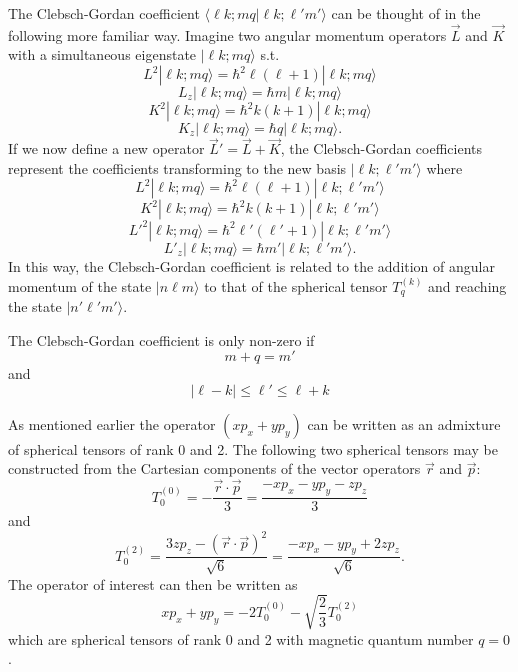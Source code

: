 \documentclass[preprint,12pt]{elsarticle}
\begin{document}
The Clebsch-Gordan coefficient $\langle\ell k;mq|\ell
k;\ell'm'\rangle$ can be thought of in the following more familiar
way.  Imagine two angular momentum operators $\vec{L}$ and $\vec{K}$
with a simultaneous eigenstate $|\ell k;mq\rangle$ s.t.
\begin{equation}
L^2|\ell k;mq\rangle=\hbar^2\ell(\ell+1)|\ell k;mq\rangle
\end{equation}
\begin{equation}
L_z|\ell k;mq\rangle=\hbar m|\ell k;mq\rangle
\end{equation}
\begin{equation}
K^2|\ell k;mq\rangle=\hbar^2k(k+1)|\ell k;mq\rangle
\end{equation}
\begin{equation}
K_z|\ell k;mq\rangle=\hbar q|\ell k;mq\rangle.
\end{equation}
If we now define a new operator $\vec{L}'=\vec{L}+\vec{K}$, the
Clebsch-Gordan coefficients represent the coefficients transforming to
the new basis $|\ell k;\ell'm'\rangle$ where
\begin{equation}
L^2|\ell k;mq\rangle=\hbar^2\ell(\ell+1)|\ell k;\ell'm'\rangle
\end{equation}
\begin{equation}
K^2|\ell k;mq\rangle=\hbar^2k(k+1)|\ell k;\ell'm'\rangle
\end{equation}
\begin{equation}
L'^2|\ell k;mq\rangle=\hbar^2\ell'(\ell'+1)|\ell k;\ell'm'\rangle
\end{equation}
\begin{equation}
L'_z|\ell k;mq\rangle=\hbar m'|\ell k;\ell'm'\rangle.
\end{equation}
In this way, the Clebsch-Gordan coefficient is related to the addition
of angular momentum of the state $|n\ell m\rangle$ to that of the
spherical tensor $T_q^{(k)}$ and reaching the state
$|n'\ell'm'\rangle$.

The Clebsch-Gordan coefficient is only non-zero if
\begin{equation}
  \label{eq:z}
  m+q=m'
\end{equation}
and
\begin{equation}
\label{eq:ell}
  |\ell-k|\leq\ell'\leq\ell+k
\end{equation}

As mentioned earlier the operator $(xp_x+yp_y)$ can be written as an
admixture of spherical tensors of rank 0 and 2.  The following two
spherical tensors may be constructed from the Cartesian components of
the vector operators $\vec{r}$ and $\vec{p}$:
\begin{equation}
T_0^{(0)}=-\frac{\vec{r}\cdot\vec{p}}{3}=\frac{-xp_x-yp_y-zp_z}{3}
\end{equation}
and
\begin{equation}
T_0^{(2)}=\frac{3zp_z-(\vec{r}\cdot\vec{p})^2}{\sqrt{6}}=\frac{-xp_x-yp_y+2zp_z}{\sqrt{6}}.
\end{equation}
The operator of interest can then be written as
\begin{equation}
xp_x+yp_y=-2T_0^{(0)}-\sqrt{\frac{2}{3}}T_0^{(2)}
\end{equation}
which are spherical tensors of rank 0 and 2 with magnetic quantum
number $q=0$.
\end{document}
